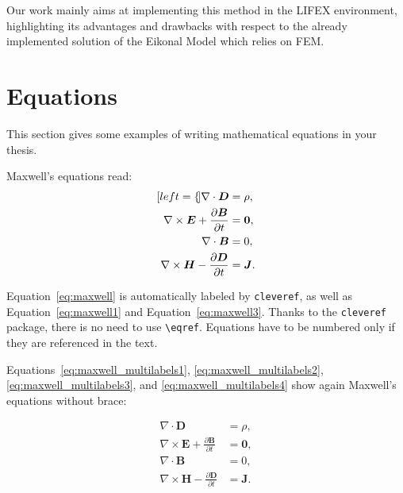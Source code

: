 \documentclass[11pt,a4paper]{article}
\begin{document}
    Our work mainly aims at implementing this method in the LIFEX environment, highlighting its advantages and drawbacks with respect to the already implemented solution of the Eikonal Model which relies on FEM.

\section{Equations}

    \label{sec:eqs}
    This section gives some examples of writing mathematical equations in your thesis.

    Maxwell's equations read:
    \begin{subequations}
        \label{eq:maxwell}
        \begin{align}[left=\empheqlbrace]
            \nabla\cdot \bm{D} & = \rho, \label{eq:maxwell1} \\
            \nabla \times \bm{E} +  \frac{\partial \bm{B}}{\partial t} & = \bm{0}, \label{eq:maxwell2} \\
            \nabla\cdot \bm{B} & = 0, \label{eq:maxwell3} \\
            \nabla \times \bm{H} - \frac{\partial \bm{D}}{\partial t} &= \bm{J}. \label{eq:maxwell4}
        \end{align}
    \end{subequations}

    Equation~\eqref{eq:maxwell} is automatically labeled by \texttt{cleveref}, as well as Equation~\eqref{eq:maxwell1} and Equation~\eqref{eq:maxwell3}. Thanks to the \verb|cleveref| package, there is no need to use \verb|\eqref|. Equations have to be numbered only if they are referenced in the text.

    Equations~\eqref{eq:maxwell_multilabels1}, \eqref{eq:maxwell_multilabels2}, \eqref{eq:maxwell_multilabels3}, and \eqref{eq:maxwell_multilabels4} show again Maxwell's equations without brace:

    \begin{align}
        \nabla\cdot \bm{D} & = \rho, \label{eq:maxwell_multilabels1} \\
        \nabla \times \bm{E} +  \frac{\partial \bm{B}}{\partial t} &= \bm{0}, \label{eq:maxwell_multilabels2} \\
        \nabla\cdot \bm{B} & = 0, \label{eq:maxwell_multilabels3} \\
        \nabla \times \bm{H} - \frac{\partial \bm{D}}{\partial t} &= \bm{J} \label{eq:maxwell_multilabels4}.
    \end{align}
\end{document}
